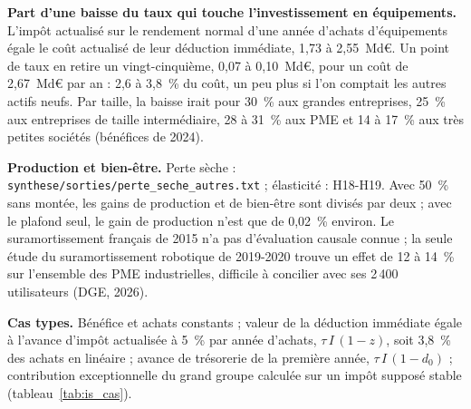\documentclass[11pt,a4paper]{article}
\begin{document}
\textbf{Part d'une baisse du taux qui touche l'investissement en équipements.} L'impôt actualisé sur le rendement normal
d'une année d'achats d'équipements égale le coût actualisé de leur déduction immédiate, 1,73 à 2,55~Md€. Un point de taux
en retire un vingt-cinquième, 0,07 à 0,10~Md€, pour un coût de 2,67~Md€ par an : 2,6 à 3,8~\% du coût, un peu plus si
l'on comptait les autres actifs neufs. Par taille, la baisse irait pour 30~\% aux grandes entreprises, 25~\% aux
entreprises de taille intermédiaire, 28 à 31~\% aux PME et 14 à 17~\% aux très petites sociétés (bénéfices de 2024).

\textbf{Production et bien-être.} Perte sèche : \texttt{synthese/sorties/perte\_seche\_autres.txt} ; élasticité :
H18-H19. Avec 50~\% sans montée, les gains de production et de bien-être sont divisés par deux ;
avec le plafond seul, le gain de production n'est que de 0,02~\% environ. Le suramortissement français de 2015 n'a pas
d'évaluation causale connue ; la seule étude du suramortissement robotique de 2019-2020 trouve un effet de 12 à 14~\%
sur l'ensemble des PME industrielles, difficile à concilier avec ses 2\,400 utilisateurs (DGE, 2026).

\textbf{Cas types.} Bénéfice et achats constants ; valeur de la déduction immédiate égale à l'avance d'impôt actualisée à
5~\% par année d'achats, $\tau\, I\,(1 - z)$, soit 3,8~\% des achats en linéaire ; avance de trésorerie de la première
année, $\tau\, I\,(1 - d_0)$ ; contribution exceptionnelle du grand groupe calculée sur un impôt supposé stable
(tableau~\ref{tab:is_cas}).
\end{document}
